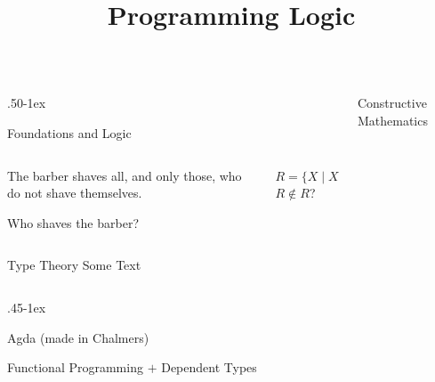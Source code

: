\documentclass[final]{beamer}
\title{Programming Logic}
\author{}
\date{}
\begin{document}
\begin{frame}
\maketitle
\vfill
  \begin{minipage}[c]{1.0\linewidth}
    \begin{columns}
      \begin{column}{.50\textwidth-1ex}%
        \begin{block}{Foundations and Logic}
          \begin{columns}
            \begin{column}{.55\textwidth}
              {\small The barber shaves all, and only those, who do
                not shave themselves.

                Who shaves the barber?
                }
            \end{column}
            \begin{column}{.45\textwidth}
              {\small $R = \{ X \mid X \notin X \}$}\\
              $R \notin R$?
            \end{column}
          \end{columns}

        \end{block}
      \end{column}
      \begin{column}{.45\textwidth}
        \begin{block}{Constructive Mathematics}

        \end{block}
      \end{column}
    \end{columns}
  \end{minipage}
  \vfill
  \begin{block}{Type Theory}
    Some Text
    \begin{columns}
      \begin{column}{.45\textwidth-1ex}%
        \begin{block}{Agda \hfill {\small (made in Chalmers)}}

          \begin{center}
            Functional Programming
            $+$
            Dependent Types
          \end{center}


\end{block}
\end{column}
\end{columns}
\end{block}
\end{frame}
\end{document}
